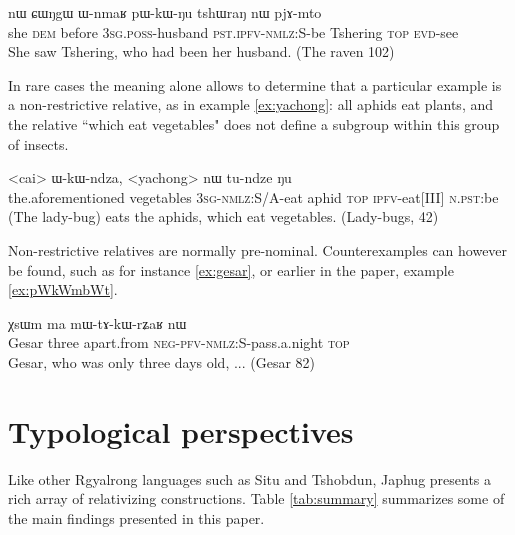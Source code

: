 \documentclass[oldfontcommands,oneside,a4paper,11pt]{article}
\newcommand{\ipa}[1]{{\phon #1}} %
\begin{document}
\begin{exe}
   \ex \label{ex:tshering}
\gll  \ipa{ɯʑo}  	\ipa{nɯ} \ipa{ɕɯŋgɯ}  	\ipa{ɯ-nmaʁ}  	\ipa{pɯ-kɯ-ŋu}  	\ipa{tshɯraŋ}  	\ipa{nɯ}  	\ipa{pjɤ-mto}  	\\
she \textsc{dem} before \textsc{3sg.poss}-husband \textsc{pst.ipfv-nmlz:S}-be Tshering \textsc{top} \textsc{evd}-see \\
 \glt   She saw Tshering, who had been her husband. (The raven 102)
   \end{exe} 

In rare cases the meaning alone allows to determine that a particular example  is a non-restrictive relative, as in example \ref{ex:yachong}: all aphids eat plants, and the relative ``which eat vegetables" does not define a subgroup within this group of insects.

\begin{exe}
   \ex  \label{ex:yachong}
\gll \ipa{iɕqha}  	<cai>  	\ipa{ɯ-kɯ-ndza},  	<yachong>  	\ipa{nɯ}  	\ipa{tu-ndze}  	\ipa{ŋu}  \\
the.aforementioned vegetables \textsc{3sg-nmlz:}S/A-eat aphid \textsc{top} \textsc{ipfv}-eat[III] \textsc{n.pst}:be \\
\glt (The lady-bug) eats the aphids, which eat vegetables. (Lady-bugs, 42)
\end{exe}



Non-restrictive relatives are normally pre-nominal. Counterexamples can however be found, such as  for instance \ref{ex:gesar}, or earlier in the paper, example \ref{ex:pWkWmbWt}.
\begin{exe}
   \ex  \label{ex:gesar}
\gll  \ipa{ʁlaŋsaŋtɕhin}  	\ipa{χsɯm}  	\ipa{ma}  	\ipa{mɯ-tɤ-kɯ-rʑaʁ}  	\ipa{nɯ}     	\\
  Gesar three apart.from \textsc{neg-pfv-nmlz:S}-pass.a.night \textsc{top}   \\
 \glt  Gesar, who was only three days old, ... (Gesar 82)
   \end{exe} 



%
\section{Typological perspectives}
Like other Rgyalrong languages such as Situ and Tshobdun, Japhug presents a rich array of relativizing constructions. Table \ref{tab:summary} summarizes some of the main findings presented in this paper. 
\end{document}
